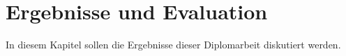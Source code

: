 \chapter{Ergebnisse und Evaluation}
In diesem Kapitel sollen die Ergebnisse dieser Diplomarbeit diskutiert werden. 